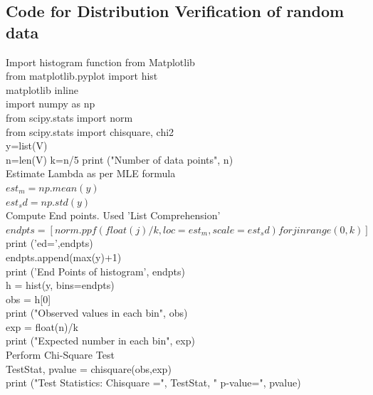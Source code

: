 \documentclass[10pt,a4paper,oneside]{report}
\begin{document}
\begin{appendix}
\begin{listing}
\section{Code for Distribution Verification of random data}
Import histogram function from Matplotlib\\
from matplotlib.pyplot import hist\\
matplotlib inline\\
import numpy as np\\
from scipy.stats import norm\\
from scipy.stats import chisquare, chi2\\
y=list(V)\\
n=len(V) %
k=n/5 %
print ("Number of data points", n)\\

\noindent Estimate Lambda as per MLE formula\\
$est_m=np.mean(y)$\\
$est_sd=np.std(y)$\\

\noindent Compute End points. Used 'List Comprehension' \\
$endpts=[norm.ppf(float(j)/k,loc=est_m, scale=est_sd) for j in range(0,k)]$\\
print ('ed=',endpts)\\
endpts.append(max(y)+1)\\
print ('End Points of histogram', endpts)\\

\noindent h = hist(y, bins=endpts)\\
obs = h[0]\\
print ("Observed values in each bin", obs)\\

\noindent exp = float(n)/k\\
print ("Expected number in each bin", exp)\\

\noindent Perform Chi-Square Test\\
TestStat, pvalue = chisquare(obs,exp)\\
print ("Test Statistics: Chisquare =", TestStat, "  p-value=", pvalue)\\


\end{listing}
\end{appendix}
\end{document}
